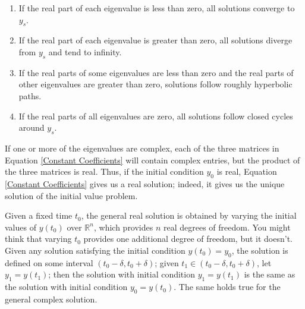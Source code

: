 \documentclass[11pt]{elegantbook}
\begin{document}
\begin{theorem}
\begin{enumerate}
        \item If the real part of each eigenvalue is less than zero, all solutions converge to $y_s$.
        \item If the real part of each eigenvalue is greater than zero, all solutions diverge from $y_s$ and tend to infinity.
        \item If the real parts of some eigenvalues are less than zero and the real parts of other eigenvalues are greater than zero, solutions follow roughly hyperbolic paths.
        \item If the real parts of all eigenvalues are zero, all solutions follow closed cycles around $y_s$.
    \end{enumerate}
\end{theorem}
\begin{note}
    If one or more of the eigenvalues are complex, each of the three matrices in Equation \ref{Constant Coefficients} will contain complex entries, but the product of the three matrices is real. Thus, if the initial condition $y_0$ is real, Equation \ref{Constant Coefficients} gives us a real solution; indeed, it gives us the unique solution of the initial value problem.
\end{note}

\begin{note}
    Given a fixed time $t_0$, the general real solution is obtained by varying the initial values of $y(t_0)$ over $\mathbb{R}^n$, which provides $n$ real degrees of freedom. You might think that varying $t_0$ provides one additional degree of freedom, but it doesn't. Given any solution satisfying the initial condition $y(t_0) = y_0$, the solution is defined on some interval $(t_0-\delta, t_0+ \delta)$; given $t_1 \in (t_0-\delta, t_0 +\delta)$, let $y_1 = y(t_1)$; then the solution with initial condition $y_1 = y(t_1)$ is the same as the solution with initial condition $y_0 = y(t_0)$. The same holds true for the general complex solution.
\end{note}
\end{document}
